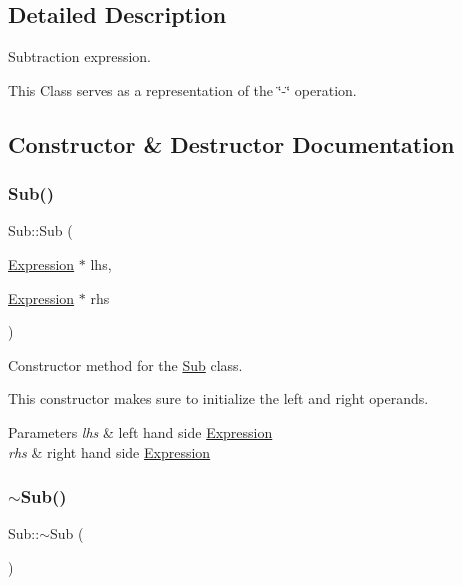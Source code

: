 \subsection{Detailed Description}
Subtraction expression. 

This Class serves as a representation of the \char`\"{}-\/\char`\"{} operation. 

\subsection{Constructor \& Destructor Documentation}
\mbox{\label{class_sub_a546d43098de078f66bc615544770133e}} 
\subsubsection{\texorpdfstring{Sub()}{Sub()}}
{\footnotesize\ttfamily Sub\+::\+Sub (\begin{DoxyParamCaption}\item[{\hyperlink{class_expression}{Expression} $\ast$}]{lhs,  }\item[{\hyperlink{class_expression}{Expression} $\ast$}]{rhs }\end{DoxyParamCaption})}



Constructor method for the \hyperlink{class_sub}{Sub} class. 

This constructor makes sure to initialize the left and right operands.


\begin{DoxyParams}{Parameters}
{\em lhs} & left hand side \hyperlink{class_expression}{Expression} \\
\hline
{\em rhs} & right hand side \hyperlink{class_expression}{Expression} \\
\hline
\end{DoxyParams}
\mbox{\label{class_sub_a01d5069c4d640cc4e6016a4794e435a5}} 
\subsubsection{\texorpdfstring{$\sim$\+Sub()}{~Sub()}}
{\footnotesize\ttfamily Sub\+::$\sim$\+Sub (\begin{DoxyParamCaption}{ }\end{DoxyParamCaption})}



